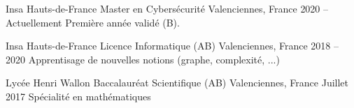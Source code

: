 
\begin{cventries}
  \cventry
    {Insa Hauts-de-France} %
    {Master en Cybersécurité} %
    {Valenciennes, France} %
    {2020 – Actuellement} %
    {Première année validé (B).}
    
  \cventry
    {Insa Hauts-de-France} %
    {Licence Informatique (AB)} %
    {Valenciennes, France} %
    {2018 – 2020} %
    {Apprentisage de nouvelles notions (graphe, complexité, ...)}

  \cventry
    {Lycée Henri Wallon} %
    {Baccalauréat Scientifique (AB)} %
    {Valenciennes, France} %
    {Juillet 2017} %
    {Spécialité en mathématiques}
\end{cventries}
